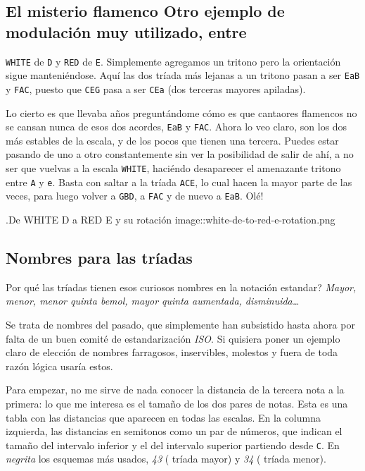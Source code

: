 \documentclass[]{article}
\begin{document}
\subsection{El misterio flamenco Otro ejemplo de modulación muy utilizado, entre} \texttt{WHITE} de \texttt{D} y \texttt{RED} de \texttt{E}. Simplemente agregamos un tritono pero la orientación sigue manteniéndose. Aquí las dos tríada más lejanas a un tritono pasan a ser \texttt{EaB} y \texttt{FAC}, puesto que \texttt{CEG} pasa a ser \texttt{CEa} (dos terceras mayores apiladas).

Lo cierto es que llevaba años preguntándome cómo es que cantaores flamencos no se cansan nunca de esos dos acordes, \texttt{EaB} y \texttt{FAC}. Ahora lo veo claro, son los dos más estables de la escala, y de los pocos que tienen una tercera. Puedes estar pasando de uno a otro constantemente sin ver la posibilidad de salir de ahí, a no ser que vuelvas a la escala \texttt{WHITE}, haciéndo desaparecer el amenazante tritono entre \texttt{A} y \texttt{e}. Basta con saltar a la tríada \texttt{ACE}, lo cual hacen la mayor parte de las veces, para luego volver a \texttt{GBD}, a \texttt{FAC} y de nuevo a \texttt{EaB}. Olé!

.De WHITE D a RED E y su rotación image::white-de-to-red-e-rotation.png

\subsection{Nombres para las tríadas}

Por qué las tríadas tienen esos curiosos nombres en la notación estandar? \emph{Mayor, menor, menor quinta bemol, mayor quinta   aumentada, disminuida\ldots{}}

Se trata de nombres del pasado, que simplemente han subsistido hasta ahora por falta de un buen comité de estandarización \emph{ISO}. Si quisiera poner un ejemplo claro de elección de nombres farragosos, inservibles, molestos y fuera de toda razón lógica usaría estos.

Para empezar, no me sirve de nada conocer la distancia de la tercera nota a la primera: lo que me interesa es el tamaño de los dos pares de notas. Esta es una tabla con las distancias que aparecen en todas las escalas. En la columna izquierda, las distancias en semitonos como un par de números, que indican el tamaño del intervalo inferior y el del intervalo superior partiendo desde \texttt{C}. En \emph{negrita} los esquemas más usados, \emph{43} ( tríada mayor) y \emph{34} ( tríada menor).
\end{document}
